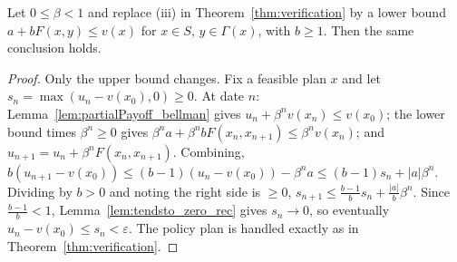 \begin{theorem}
\label{thm:verification_lowerBound}
\leanok
{}
Let $0 \le \beta < 1$ and replace (iii) in Theorem~\ref{thm:verification} by a lower bound
$a + b F(x, y) \le v(x)$ for $x \in S$, $y \in \Gamma(x)$, with $b \ge 1$. Then the same conclusion holds.
\end{theorem}
\begin{proof}
\leanok
Only the upper bound changes. Fix a feasible plan $x$ and let $s_n = \max(u_n - v(x_0), 0) \ge 0$.
At date $n$: Lemma~\ref{lem:partialPayoff_bellman} gives $u_n + \beta^n v(x_n) \le v(x_0)$; the lower
bound times $\beta^n \ge 0$ gives $\beta^n a + \beta^n b F(x_n, x_{n+1}) \le \beta^n v(x_n)$; and
$u_{n+1} = u_n + \beta^n F(x_n, x_{n+1})$. Combining,
$b (u_{n+1} - v(x_0)) \le (b - 1)(u_n - v(x_0)) - \beta^n a \le (b - 1) s_n + |a| \beta^n$.
Dividing by $b > 0$ and noting the right side is $\ge 0$,
$s_{n+1} \le \frac{b-1}{b} s_n + \frac{|a|}{b} \beta^n$. Since $\frac{b-1}{b} < 1$,
Lemma~\ref{lem:tendsto_zero_rec} gives $s_n \to 0$, so eventually $u_n - v(x_0) \le s_n < \varepsilon$.
The policy plan is handled exactly as in Theorem~\ref{thm:verification}.
\end{proof}

